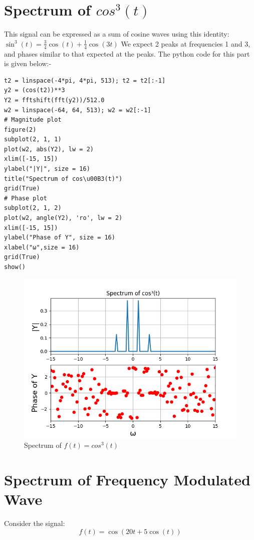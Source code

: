 \documentclass{article}
\begin{document}
\section{Spectrum of $cos^3(t)$}
This signal can be expressed as a sum of cosine waves using this identity:\newline
$\sin^3(t) = \frac{3}{4}\cos(t) + \frac{1}{4}\cos(3t)$\newline
We expect 2 peaks at frequencies 1 and 3, and phases similar to that expected at the peaks.
The python code for this part is given below:-
\begin{lstlisting}
t2 = linspace(-4*pi, 4*pi, 513); t2 = t2[:-1]
y2 = (cos(t2))**3
Y2 = fftshift(fft(y2))/512.0
w2 = linspace(-64, 64, 513); w2 = w2[:-1]
# Magnitude plot
figure(2)
subplot(2, 1, 1)
plot(w2, abs(Y2), lw = 2)
xlim([-15, 15])
ylabel("|Y|", size = 16)
title("Spectrum of cos\u00B3(t)")
grid(True)
# Phase plot
subplot(2, 1, 2)
plot(w2, angle(Y2), 'ro', lw = 2)
xlim([-15, 15])
ylabel("Phase of Y", size = 16)
xlabel("ω",size = 16)
grid(True)
show()
\end{lstlisting}
\begin{figure}[h!]
\centering
\includegraphics[scale=0.6]{Ass8_Figur_6.png}
\caption{Spectrum of $f(t) = cos^3(t)$}
\label{fig:universe}
\end{figure}
\clearpage
\section{Spectrum of Frequency Modulated Wave}
Consider the signal:\newline
\begin{equation}
f(t) =  \cos(20t +5 \cos(t))    
\end{equation}
\end{document}

